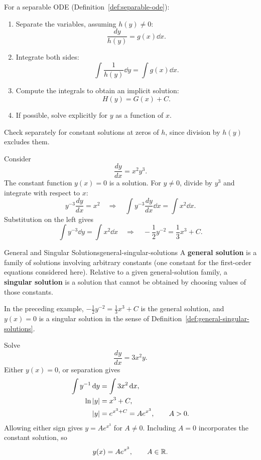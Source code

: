 For a separable ODE (Definition~\ref{def:separable-ode}):
\begin{enumerate}
  \item Separate the variables, assuming $h(y)\ne0$:
        \[
          \frac{dy}{h(y)}=g(x)\dd{x}.
        \]
  \item Integrate both sides:
        \[
          \int\frac{1}{h(y)}\dd{y}=\int g(x)\dd{x}.
        \]
  \item Compute the integrals to obtain an implicit solution:
        \[
          H(y)=G(x)+C.
        \]
  \item If possible, solve explicitly for $y$ as a function of $x$.
\end{enumerate}
Check separately for constant solutions at zeros of $h$, since division by $h(y)$ excludes them.

\begin{example}
  Consider
  \[
    \frac{dy}{dx}=x^2y^3.
  \]
  The constant function $y(x)=0$ is a solution. For $y\ne0$, divide by $y^3$ and integrate with respect to $x$:
  \[
    y^{-3}\frac{dy}{dx}=x^2
    \quad\Longrightarrow\quad
    \int y^{-3}\frac{dy}{dx}\dd{x}=\int x^2\dd{x}.
  \]
  Substitution on the left gives
  \[
    \int y^{-3}\dd{y}=\int x^2\dd{x}
    \quad\Longrightarrow\quad
    -\frac12 y^{-2}=\frac13 x^3+C.
  \]
\end{example}

\begin{definition}{General and Singular Solutions}{general-singular-solutions}
  A \textbf{general solution} is a family of solutions involving arbitrary constants (one constant for the first-order equations considered here).
  Relative to a given general-solution family, a \textbf{singular solution} is a solution that cannot be obtained by choosing values of those constants.
\end{definition}

In the preceding example, $-\tfrac12 y^{-2}=\tfrac13 x^3+C$ is the general solution, and $y(x)=0$ is a singular solution in the sense of Definition~\ref{def:general-singular-solutions}.

\begin{example}
  Solve
  \[
    \frac{dy}{dx}=3x^2y.
  \]
  Either $y(x)=0$, or separation gives
  \begin{align*}
    \int y^{-1}\,\mathrm{d}y & = \int 3x^2\,\mathrm{d}x,                \\
    \ln\left\lvert y \right\rvert        & = x^3+C,                          \\
    \left\lvert y \right\rvert           & = e^{x^3+C}=Ae^{x^3}, \qquad A>0.
  \end{align*}
  Allowing either sign gives $y=Ae^{x^3}$ for $A\ne0$. Including $A=0$ incorporates the constant solution, so
  \[
    y(x)=Ae^{x^3},\qquad A\in\mathbb{R}.
  \]
\end{example}


